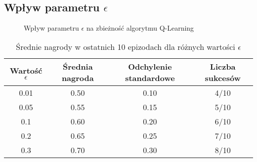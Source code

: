 \documentclass{article}
\begin{document}
\subsection{Wpływ parametru $\epsilon$}
\begin{figure}[h!]
    \centering
    \caption{Wpływ parametru $\epsilon$ na zbieżność algorytmu Q-Learning}
    \label{fig:epsilon_impact}
\end{figure}

\begin{table}[h!]
    \centering
    \caption{Średnie nagrody w ostatnich 10 epizodach dla różnych wartości $\epsilon$}
    \label{tab:epsilon_impact}
    \begin{tabular}{cccc}
        \toprule
        Wartość $\epsilon$ & Średnia nagroda & Odchylenie standardowe & Liczba sukcesów \\ 
        \midrule
        0.01 & 0.50 & 0.10 & 4/10 \\
        0.05 & 0.55 & 0.15 & 5/10 \\
        0.1 & 0.60 & 0.20 & 6/10 \\
        0.2 & 0.65 & 0.25 & 7/10 \\
        0.3 & 0.70 & 0.30 & 8/10 \\
        \bottomrule
    \end{tabular}
\end{table}
\end{document}
